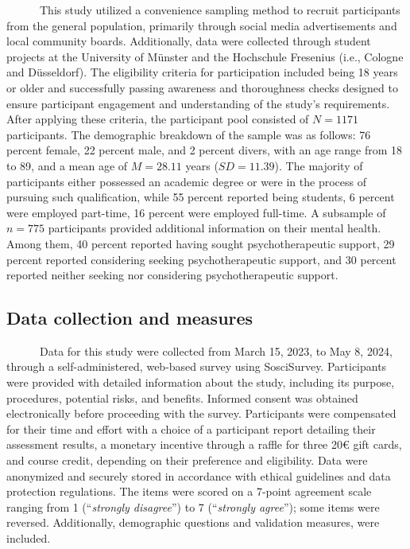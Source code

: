 \documentclass[
  man,floatsintext]{apa7}
\begin{document}
~~~~~~This study utilized a convenience sampling method to recruit participants from the general population, primarily through social media advertisements and local community boards. Additionally, data were collected through student projects at the University of Münster and the Hochschule Fresenius (i.e., Cologne and Düsseldorf). The eligibility criteria for participation included being 18 years or older and successfully passing awareness and thoroughness checks designed to ensure participant engagement and understanding of the study's requirements. After applying these criteria, the participant pool consisted of \(N = 1171\) participants. The demographic breakdown of the sample was as follows: 76 percent female, 22 percent male, and 2 percent divers, with an age range from 18 to 89, and a mean age of \(M = 28.11\) years (\(SD = 11.39\)). The majority of participants either possessed an academic degree or were in the process of pursuing such qualification, while 55 percent reported being students, 6 percent were employed part-time, 16 percent were employed full-time. A subsample of \(n = 775\) participants provided additional information on their mental health. Among them, 40 percent reported having sought psychotherapeutic support, 29 percent reported considering seeking psychotherapeutic support, and 30 percent reported neither seeking nor considering psychotherapeutic support.

\subsection{Data collection and measures}\label{data-collection-and-measures}

~~~~~~Data for this study were collected from March 15, 2023, to May 8, 2024, through a self-administered, web-based survey using SosciSurvey. Participants were provided with detailed information about the study, including its purpose, procedures, potential risks, and benefits. Informed consent was obtained electronically before proceeding with the survey. Participants were compensated for their time and effort with a choice of a participant report detailing their assessment results, a monetary incentive through a raffle for three 20€ gift cards, and course credit, depending on their preference and eligibility. Data were anonymized and securely stored in accordance with ethical guidelines and data protection regulations. The items were scored on a 7-point agreement scale ranging from 1 (``\emph{strongly disagree}'') to 7 (``\emph{strongly agree}''); some items were reversed. Additionally, demographic questions and validation measures, were included.
\end{document}
